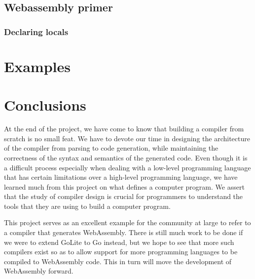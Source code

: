 \documentclass{article}
\begin{document}


\subsection{Webassembly primer}

\subsubsection{Declaring locals}

\section{Examples}

\section{Conclusions}
At the end of the project, we have come to know that building a compiler from scratch is no small feat. We have to devote our time in designing the architecture of the compiler from parsing to code generation, while maintaining the correctness of the syntax and semantics of the generated code. Even though it is a difficult process especially when dealing with a low-level programming language that has certain limitations over a high-level programming language, we have learned much from this project on what defines a computer program. We assert that the study of compiler design is crucial for programmers to understand the tools that they are using to build a computer program.

This project serves as an excellent example for the community at large to refer to a compiler that generates WebAssembly. There is still much work to be done if we were to extend GoLite to Go instead, but we hope to see that more such compilers exist so as to allow support for more programming languages to be compiled to WebAssembly code. This in turn will move the development of WebAssembly forward.
\end{document}
